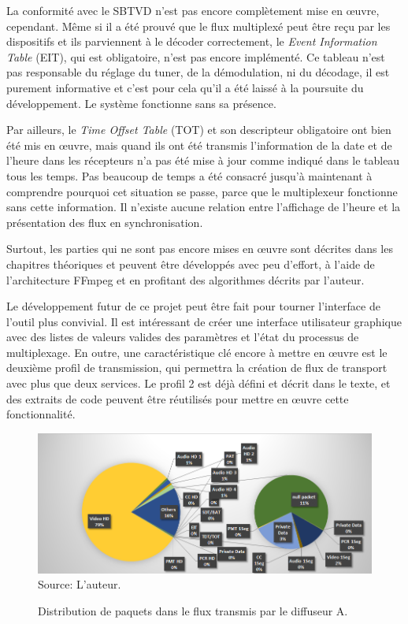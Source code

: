 \documentclass[12pt,a4paper]{article}
\begin{document}
La conformité avec le SBTVD n'est pas encore complètement mise en œuvre, cependant. Même si il a été prouvé que le flux multiplexé peut être reçu par les dispositifs et ils parviennent à le décoder correctement, le \textit{Event Information Table} (EIT), qui est obligatoire, n'est pas encore implémenté. Ce tableau n'est pas responsable du réglage du tuner, de la démodulation, ni du décodage, il est purement informative et c'est pour cela qu'il a été laissé à la poursuite du développement. Le système fonctionne sans sa présence.

Par ailleurs, le \textit{Time Offset Table} (TOT) et son descripteur obligatoire ont bien été mis en œuvre, mais quand ils ont été transmis l'information de la date et de l'heure dans les récepteurs n'a pas été mise à jour comme indiqué dans le tableau tous les temps. Pas beaucoup de temps a été consacré jusqu'à maintenant à comprendre pourquoi cet situation se passe, parce que le multiplexeur fonctionne sans cette information. Il n'existe aucune relation entre l'affichage de l'heure et la présentation des flux en synchronisation.

Surtout, les parties qui ne sont pas encore mises en œuvre sont décrites dans les chapitres théoriques et peuvent être développés avec peu d'effort, à l'aide de l'architecture FFmpeg et en profitant des algorithmes décrits par l'auteur.

Le développement futur de ce projet peut être fait pour tourner l'interface de l'outil plus convivial. Il est intéressant de créer une interface utilisateur graphique avec des listes de valeurs valides des paramètres et l'état du processus de multiplexage. En outre, une caractéristique clé encore à mettre en œuvre est le deuxième profil de transmission, qui permettra la création de flux de transport avec plus que deux services. Le profil 2 est déjà défini et décrit dans le texte, et des extraits de code peuvent être réutilisés pour mettre en œuvre cette fonctionnalité.

\appendix
\newpage
{}
\label{resultats}

\begin{figure}[!h]
\centering
\caption{Distribution de paquets dans le flux transmis par le diffuseur A.}
\includegraphics[width=0.9\linewidth]{pictures/graph_rbs_dump.png}
\\Source: L'auteur.
\label{fig:graph_rbs_dump}
\end{figure}
\end{document}
